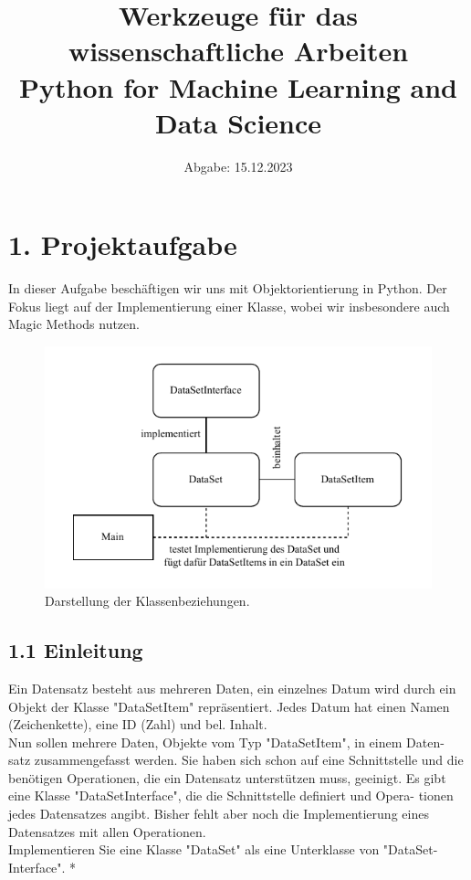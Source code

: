 \documentclass[]{article}
\begin{document}
\title{\textbf{ Werkzeuge für das wissenschaftliche Arbeiten}\\
 \normalsize Python for Machine Learning and Data Science}
\date{Abgabe: 15.12.2023}
\maketitle

\renewcommand{\contentsname}{Inhaltsverzeichnis} 
\tableofcontents 

\vspace{1em}

\section*{1. Projektaufgabe}
In dieser Aufgabe beschäftigen wir uns mit Objektorientierung in Python. Der Fokus liegt auf der Implementierung einer Klasse, wobei wir insbesondere auch Magic Methods nutzen.\\

\renewcommand{\figurename}{Abbildung}
\begin{figure}[htbp]
  \centering
  \includegraphics[width=\textwidth]{../diagram/classes_files.pdf}
  \caption{Darstellung der Klassenbeziehungen.\normalsize}
\end{figure}

\subsection*{1.1 Einleitung}
Ein Datensatz besteht aus mehreren Daten, ein einzelnes Datum wird durch ein Objekt der Klasse "DataSetItem" repräsentiert. Jedes Datum hat einen Namen (Zeichenkette), eine ID (Zahl) und bel. Inhalt. \\
Nun sollen mehrere Daten, Objekte vom Typ "DataSetItem", in einem Daten- satz zusammengefasst werden. Sie haben sich schon auf eine Schnittstelle und die benötigen Operationen, die ein Datensatz unterstützen muss, geeinigt. Es gibt eine Klasse "DataSetInterface", die die Schnittstelle definiert und Opera- tionen jedes Datensatzes angibt. Bisher fehlt aber noch die Implementierung eines Datensatzes mit allen Operationen. 
\\
Implementieren Sie eine Klasse "DataSet" als eine Unterklasse von "DataSet- Interface".
*
\end{document}
